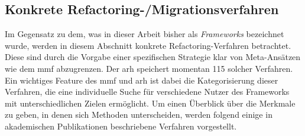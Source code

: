 

\subsection{Konkrete Refactoring-/Migrationsverfahren}

Im Gegensatz zu dem, was in dieser Arbeit bisher als \emph{Frameworks} bezeichnet wurde, werden in diesem Abschnitt konkrete Refactoring-Verfahren betrachtet.
Diese sind durch die Vorgabe einer spezifischen Strategie klar von Meta-Ansätzen wie dem \gls{mmf} abzugrenzen.
Der \gls{arh} speichert momentan 115 solcher Verfahren.
Ein wichtiges Feature des \gls{mmf} und \gls{arh} ist dabei die Kategorisierung dieser Verfahren, die eine individuelle Suche für verschiedene Nutzer des Frameworks mit unterschiedlichen Zielen ermöglicht.
Um einen Überblick über die Merkmale zu geben, in denen sich Methoden unterscheiden, werden folgend einige in akademischen Publikationen beschriebene Verfahren vorgestellt.


